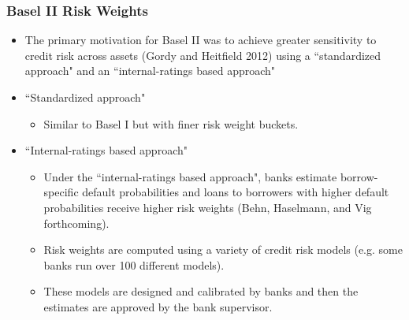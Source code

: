 \documentclass{beamer}
\begin{document}
\begin{frame}[label = basel_ii]
\frametitle{Basel II Risk Weights}

\begin{itemize}[<+->]


\item The primary motivation for Basel II was to achieve greater sensitivity to credit risk across assets (Gordy and Heitfield 2012) using a ``standardized approach" and an ``internal-ratings based approach"

\bigskip

\item ``Standardized approach" 

\begin{itemize}[<+->]

\item Similar to Basel I but with finer risk weight buckets.

\end{itemize}


\bigskip

\item ``Internal-ratings based approach"

\begin{itemize}[<+->]

\item Under the ``internal-ratings based approach", banks estimate borrow-specific default probabilities and loans to borrowers with higher default probabilities receive higher risk weights (Behn, Haselmann, and Vig forthcoming).

\bigskip

\item Risk weights are computed using a variety of credit risk models (e.g. some banks run over 100 different models).

\bigskip

\item These models are designed and calibrated by banks and then the estimates are approved by the bank supervisor.

\end{itemize}
\end{itemize}


\hyperlink{risk_weights}{}

\end{frame}
\end{document}
